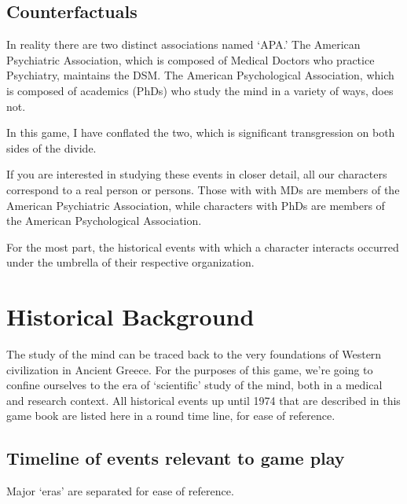 \begin{refsection}
\section{Counterfactuals}
\label{counterfactuals}

In reality there are two distinct associations named `APA.' The American Psychiatric Association, which is composed of Medical Doctors who practice Psychiatry, maintains the DSM. The American Psychological Association, which is composed of academics (PhDs) who study the mind in a variety of ways, does not. 

In this game, I have conflated the two, which is significant transgression on both sides of the divide. 

If you are interested in studying these events in closer detail, all our characters correspond to a real person or persons. Those with with MDs are members of the American Psychiatric Association, while characters with PhDs are members of the American Psychological Association. 

For the most part, the historical events with which a character interacts occurred under the umbrella of their respective organization.

\pagebreak 

\chapter{Historical Background}
\label{historicalbackground}

The study of the mind can be traced back to the very foundations of Western civilization in Ancient Greece. For the purposes of this game, we're going to confine ourselves to the era of `scientific' study of the mind, both in a medical and research context. All historical events up until 1974 that are described in this game book are listed here in a round time line, for ease of reference.

\section{Timeline of events relevant to game play}
\label{timelineofeventsrelevanttogameplay}

Major `eras' are separated for ease of reference.


\end{refsection}
